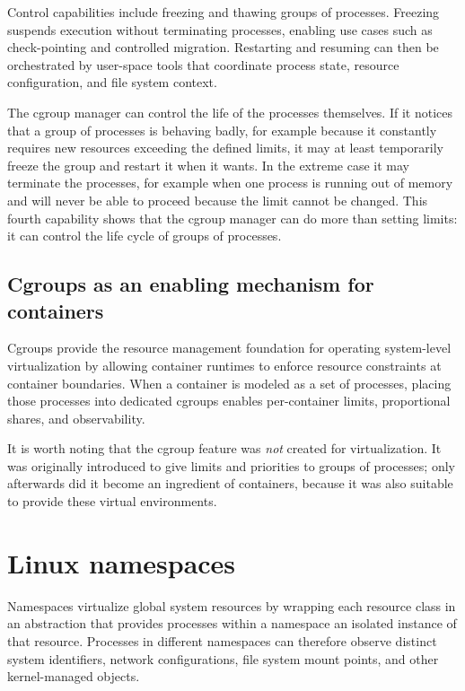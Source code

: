 Control capabilities include freezing and thawing groups of processes. Freezing suspends execution without terminating processes, enabling use cases such as check-pointing and controlled migration. Restarting and resuming can then be orchestrated by user-space tools that coordinate process state, resource configuration, and file system context.

The cgroup manager can control the life of the processes themselves. If it notices that a group of processes is behaving badly, for example because it constantly requires new resources exceeding the defined limits, it may at least temporarily freeze the group and restart it when it wants. In the extreme case it may terminate the processes, for example when one process is running out of memory and will never be able to proceed because the limit cannot be changed. This fourth capability shows that the cgroup manager can do more than setting limits: it can control the life cycle of groups of processes.

\subsection{Cgroups as an enabling mechanism for containers}

Cgroups provide the resource management foundation for operating system-level virtualization by allowing container runtimes to enforce resource constraints at container boundaries. When a container is modeled as a set of processes, placing those processes into dedicated cgroups enables per-container limits, proportional shares, and observability.

It is worth noting that the cgroup feature was \emph{not} created for virtualization. It was originally introduced to give limits and priorities to groups of processes; only afterwards did it become an ingredient of containers, because it was also suitable to provide these virtual environments.

\section{Linux namespaces}

Namespaces virtualize global system resources by wrapping each resource class in an abstraction that provides processes within a namespace an isolated instance of that resource. Processes in different namespaces can therefore observe distinct system identifiers, network configurations, file system mount points, and other kernel-managed objects.

